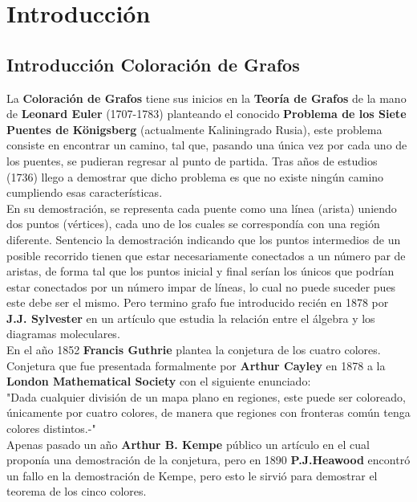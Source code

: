 \documentclass[12pt]{report}
\date{18 de Mayo de 2018}
\author{Universidad Nacional de Salta \and Departamento de Informatica
\and Teoria de la Computacion 3
\\ Marmanillo, Walter Gabriel}
\begin{document}
	
\newtheorem{thm}{Definición}[section]
\newtheorem{tm}{Teorema}[section]
\providecommand{\abs}[1]{\lvert#1\rvert}
\tableofcontents

\chapter{Introducción}
\section{Introducción Coloración de Grafos}
La \textbf{Coloración de Grafos} tiene sus inicios en la \textbf{Teoría de Grafos} de la mano de \textbf{Leonard Euler} (1707-1783) planteando el conocido \textbf{Problema de los Siete Puentes de Königsberg} (actualmente Kaliningrado Rusia), este problema consiste en encontrar un camino, tal que, pasando una única vez por cada uno de los puentes, se pudieran regresar al punto de partida. Tras años de estudios (1736) llego a demostrar que dicho problema es que no existe ningún camino cumpliendo esas características.\\
En su demostración, se representa cada puente como una línea (arista) uniendo dos puntos (vértices), cada uno de los cuales se correspondía con una región diferente. Sentencio la demostración indicando que los puntos intermedios de un posible recorrido tienen que estar necesariamente conectados a un número par de aristas, de forma tal que los puntos inicial y final serían los únicos que podrían estar conectados por un número impar de líneas, lo cual no puede suceder pues este debe ser el mismo. Pero termino grafo fue introducido recién en 1878 por \textbf{J.J. Sylvester} en un artículo que estudia la relación entre el álgebra y los diagramas moleculares.\\ 
En el año 1852 \textbf{Francis Guthrie} plantea la conjetura de los cuatro colores. Conjetura que fue presentada formalmente por \textbf{Arthur Cayley} en 1878 a la \textbf{London Mathematical Society} con el siguiente enunciado:\\
\textsf{"Dada cualquier división de  un mapa plano en regiones, este puede ser coloreado, únicamente por cuatro colores, de manera que regiones con fronteras común tenga colores distintos.-"}\\
Apenas pasado un año \textbf{Arthur B. Kempe} público un artículo en el cual proponía una demostración de la conjetura, pero en 1890 \textbf{P.J.Heawood} encontró un fallo en la demostración de Kempe, pero esto le sirvió para demostrar el teorema de los cinco colores.\\
\end{document}
